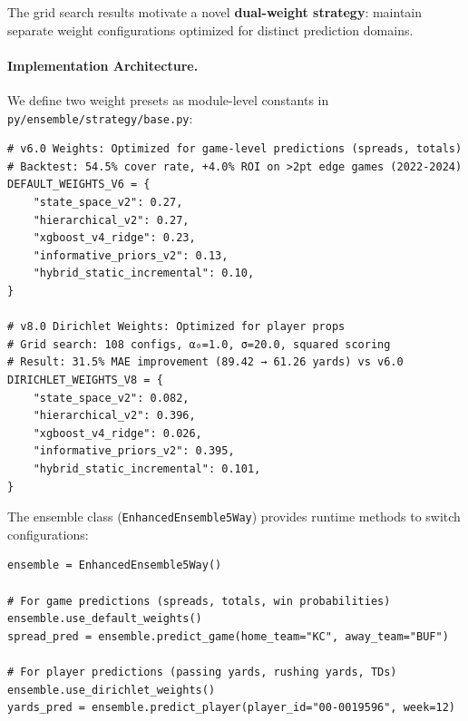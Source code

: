The grid search results motivate a novel \textbf{dual-weight strategy}: maintain separate weight configurations optimized for distinct prediction domains.

\paragraph{Implementation Architecture.}
We define two weight presets as module-level constants in \texttt{py/ensemble/strategy/base.py}:
\begin{verbatim}
# v6.0 Weights: Optimized for game-level predictions (spreads, totals)
# Backtest: 54.5% cover rate, +4.0% ROI on >2pt edge games (2022-2024)
DEFAULT_WEIGHTS_V6 = {
    "state_space_v2": 0.27,
    "hierarchical_v2": 0.27,
    "xgboost_v4_ridge": 0.23,
    "informative_priors_v2": 0.13,
    "hybrid_static_incremental": 0.10,
}

# v8.0 Dirichlet Weights: Optimized for player props
# Grid search: 108 configs, α₀=1.0, σ=20.0, squared scoring
# Result: 31.5% MAE improvement (89.42 → 61.26 yards) vs v6.0
DIRICHLET_WEIGHTS_V8 = {
    "state_space_v2": 0.082,
    "hierarchical_v2": 0.396,
    "xgboost_v4_ridge": 0.026,
    "informative_priors_v2": 0.395,
    "hybrid_static_incremental": 0.101,
}
\end{verbatim}

The ensemble class (\texttt{EnhancedEnsemble5Way}) provides runtime methods to switch configurations:
\begin{verbatim}
ensemble = EnhancedEnsemble5Way()

# For game predictions (spreads, totals, win probabilities)
ensemble.use_default_weights()
spread_pred = ensemble.predict_game(home_team="KC", away_team="BUF")

# For player predictions (passing yards, rushing yards, TDs)
ensemble.use_dirichlet_weights()
yards_pred = ensemble.predict_player(player_id="00-0019596", week=12)
\end{verbatim}

